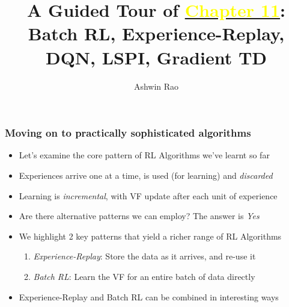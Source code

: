 \documentclass[handout]{beamer}
\title[Batch RL Chapter]{A Guided Tour of \href{http://stanford.edu/~ashlearn/RLForFinanceBook/book.pdf}{\underline{\textcolor{yellow}{Chapter 11}}}: \\ Batch RL, Experience-Replay, DQN, LSPI, Gradient TD} %
\author{Ashwin Rao} %
\institute[Stanford] %
{ICME, Stanford University
}
\date %
\begin{document}
\lstset{language=Python}  
\begin{frame}
\titlepage %
\end{frame}


\begin{frame}
\frametitle{Moving on to practically sophisticated algorithms}
\begin{itemize}[<+->]
\item Let's examine the core pattern of RL Algorithms we've learnt so far
\item Experiences arrive one at a time, is used (for learning) and {\em discarded}
\item Learning is {\em incremental}, with VF update after each unit of experience
\item Are there alternative patterns we can employ? The answer is {\em Yes}
\item We highlight 2 key patterns that yield a richer range of RL Algorithms
\begin{enumerate}[<+->]
\item {\em Experience-Replay}: Store the data as it arrives, and re-use it
\item {\em Batch RL}: Learn the VF for an entire batch of data directly
\end{enumerate} 
\item Experience-Replay and Batch RL can be combined in interesting ways
\end{itemize}
\end{frame}
\end{document}
